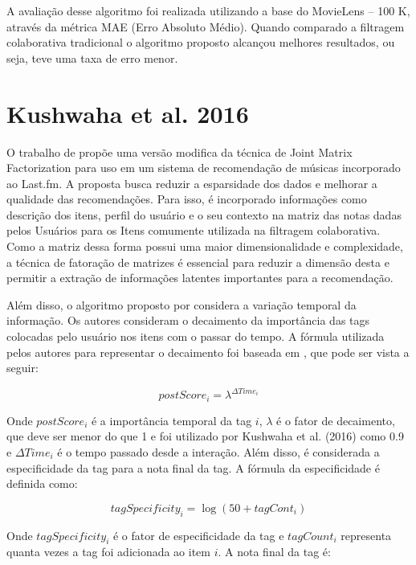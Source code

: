 A avaliação desse algoritmo foi realizada utilizando a base do MovieLens – 100 K, através da métrica MAE (Erro Absoluto
Médio). Quando comparado a filtragem colaborativa tradicional o algoritmo proposto alcançou melhores resultados, ou
seja, teve uma taxa de erro menor.

\section{Kushwaha et al. 2016}

O trabalho de  propõe uma versão modifica da técnica de Joint Matrix Factorization
para uso em um sistema de recomendação de músicas incorporado ao Last.fm. A proposta busca reduzir a esparsidade dos
dados e melhorar a qualidade das recomendações. Para isso, é incorporado informações como descrição dos itens, perfil
do usuário e o seu contexto na matriz das notas dadas pelos Usuários para os Itens comumente utilizada na filtragem
colaborativa. Como a matriz dessa forma possui uma maior dimensionalidade e complexidade, a técnica de fatoração de
matrizes é essencial para reduzir a dimensão desta e permitir a extração de informações latentes importantes para a
recomendação.

Além disso, o algoritmo proposto por  considera a variação temporal da informação.
Os autores consideram o decaimento da importância das tags colocadas pelo usuário nos itens com o passar do tempo. A
fórmula utilizada pelos autores para representar o decaimento foi baseada em , que pode ser
vista a seguir:

\begin{equation}
  postScore_i = \lambda^{\Delta Time_i}
  \label{eq:kushwaha-funcao-decaimento}
\end{equation}

Onde $postScore_i$ é a importância temporal da tag $i$, $\lambda$ é o fator de decaimento, que deve ser menor do que 1
e foi utilizado por Kushwaha et al. (2016) como 0.9 e $\Delta Time_i$ é o tempo passado desde a interação. Além disso,
é considerada a especificidade da tag para a nota final da tag. A fórmula da especificidade é definida como:

\begin{equation}
  tagSpecificity_i = \log(50+tagCont_i)
  \label{eq:kushwaha-especificidade}
\end{equation}

Onde $tagSpecificity_i$ é o fator de especificidade da tag e $tagCount_i$ representa quanta vezes a tag foi adicionada
ao item $i$. A nota final da tag é:

